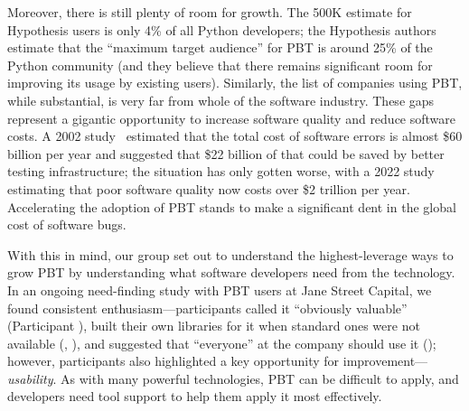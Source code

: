 Moreover, there is still plenty of room
for growth.
The 500K estimate for
Hypothesis users is only 4\% of all Python developers; the Hypothesis
authors estimate that the ``maximum target audience'' for PBT is around
25\% of the Python
community (and they believe that there remains significant room for
improving its usage by existing users).
Similarly, the list of
companies using PBT, while substantial, is very far from whole of the software
industry.
These gaps represent a gigantic opportunity to increase software quality
and reduce software costs.
A 2002 study~\cn{} estimated that the total cost of software errors is almost
\$60 billion per year and suggested that \$22 billion of that could be saved by
better testing infrastructure; the situation has only gotten worse, with a 2022
study~\cn{} estimating that poor software quality now costs over \$2 trillion per
year. Accelerating the adoption of PBT stands to make a
significant dent
in the global cost of software bugs.

With this in mind, our group set out to understand the highest-leverage ways to grow PBT by
understanding what software developers need from the technology.
In an ongoing need-finding study with PBT users at Jane Street
Capital, we found consistent enthusiasm---participants called it
``obviously valuable'' (Participant ), built their own
libraries for it when standard ones were not available
(, ), and suggested that ``everyone''
at the company should use it (); however, participants
also highlighted a key opportunity for improvement---{\em usability}. As with
many powerful technologies, PBT can be difficult to apply, and developers
need tool support to help them apply it most effectively.



